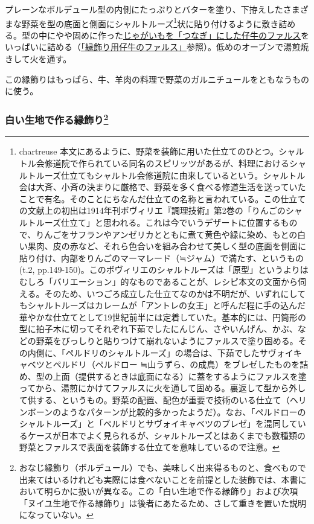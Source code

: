 \begin{recette}
プレーンなボルデュール型の内側にたっぷりとバターを塗り、下拵えしたさまざまな野菜を型の底面と側面にシャルトルーズ\footnote{chartreuse
  本文にあるように、野菜を装飾に用いた仕立てのひとつ。シャルトル会修道院で作られている同名のスピリッツがあるが、料理におけるシャルトルーズ仕立てもシャルトル会修道院に由来しているという。シャルトル会は大斉、小斉の決まりに厳格で、野菜を多く食べる修道生活を送っていたことで有名。そのことにちなんだ仕立ての名称と言われている。この仕立ての文献上の初出は1914年刊ボヴィリエ『調理技術』第2巻の「りんごのシャルトルーズ仕立て」と思われる。これは今でいうデザートに位置するもので、りんごをサフランやアンゼリカとともに煮て黄色や緑に染め、もとの白い果肉、皮の赤など、それら色合いを組み合わせて美しく型の底面を側面に貼り付け、内部をりんごのマーマレード（≒ジャム）で満たす、というもの(t.2,
  pp.149-150)。このボヴィリエのシャルトルーズは「原型」というよりはむしろ「バリエーション」的なものであることが、レシピ本文の文面から伺える。そのため、いつごろ成立した仕立てなのかは不明だが、いずれにしてもシャルトルーズはカレームが「アントレの女王」と呼んだ程に手の込んだ華やかな仕立てとして19世紀前半には定着していた。基本的には、円筒形の型に拍子木に切ってそれぞれ下茹でしたにんじん、さやいんげん、かぶ、などの野菜をびっしりと貼りつけて崩れないようにファルスで塗り固める。その内側に、「ペルドリのシャルトルーズ」の場合は、下茹でしたサヴォイキャベツとペルドリ（ペルドロー
  ≒山うずら、の成鳥）をブレゼしたものを詰め、型の上面（提供するときは底面になる）に蓋をするようにファルスを塗ってから、湯煎にかけてファルスに火を通して固める。裏返して型から外して供する、というもの。野菜の配置、配色が重要で技術のいる仕立て（ヘリンボーンのようなパターンが比較的多かったようだ）。なお、「ペルドローのシャルトルーズ」と「ペルドリとサヴォイキャベツのブレゼ」を混同しているケースが日本でよく見られるが、シャルトルーズとはあくまでも数種類の野菜とファルスで表面を装飾する仕立てを意味しているので注意。}状に貼り付けるように敷き詰める。型の中にやや固めに作った\protect\hyperlink{farce-de-veau-pour-bordures}{じゃがいもを「つなぎ」にした仔牛のファルス}をいっぱいに詰める（\protect\hyperlink{farce-de-veau-pour-bordures}{「縁飾り用仔牛のファルス」}参照）。低めのオーブンで湯煎焼きして火を通す。

この縁飾りはもっぱら、牛、羊肉の料理で野菜のガルニチュールをともなうものに使う。

\atoaki{}

\hypertarget{bordures-en-pate-blanche}{%
\subsubsection[白い生地で作る縁飾り]{\texorpdfstring{白い生地で作る縁飾り\footnote{おなじ縁飾り（ボルデュール）でも、美味しく出来得るものと、食べもので出来てはいるけれども実際には食べないことを前提とした装飾では、本書において明らかに扱いが異なる。この「白い生地で作る縁飾り」および次項「ヌイユ生地で作る縁飾り」は後者にあたるため、さして重きを置いた説明になっていない。}}{白い生地で作る縁飾り}}\label{bordures-en-pate-blanche}}


\end{recette}
